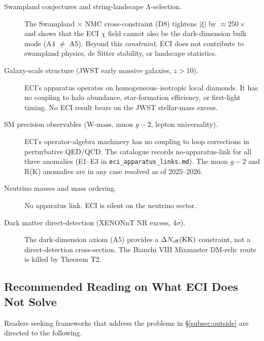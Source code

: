\begin{description}
\item[Swampland conjectures and string-landscape Λ-selection.]
  The Swampland $\times$ NMC cross-constraint (D8) tightens $|\xi|$ by
  $\approx 250\times$ and shows that the ECI $\chi$ field cannot also be the
  dark-dimension bulk mode (A4 $\neq$ A5).  Beyond this \emph{constraint},
  ECI does not contribute to swampland physics, de Sitter stability, or
  landscape statistics.

\item[Galaxy-scale structure (JWST early massive galaxies, $z > 10$).]
  ECI's apparatus operates on homogeneous--isotropic local diamonds.
  It has no coupling to halo abundance, star-formation efficiency, or
  first-light timing.  No ECI result bears on the JWST stellar-mass excess.

\item[SM precision observables (W-mass, muon $g-2$, lepton universality).]
  ECI's operator-algebra machinery has no coupling to loop corrections in
  perturbative QED/QCD.  The catalogue records no-apparatus-link for all
  three anomalies (E1--E3 in \texttt{eci\_apparatus\_links.md}).
  The muon $g-2$ and R(K) anomalies are in any case resolved as of 2025--2026.

\item[Neutrino masses and mass ordering.]
  No apparatus link.  ECI is silent on the neutrino sector.

\item[Dark matter direct-detection (XENONnT NR excess, 4$\sigma$).]
  The dark-dimension axiom (A5) provides a $\Delta N_{\rm eff}({\rm KK})$
  constraint, not a direct-detection cross-section.  The Bianchi VIII
  Mixmaster DM-relic route is killed by Theorem T2.

\end{description}

\subsection{Recommended Reading on What ECI Does Not Solve}
\label{subsec:reading}

Readers seeking frameworks that address the problems in
\S\ref{subsec:outside} are directed to the following.

